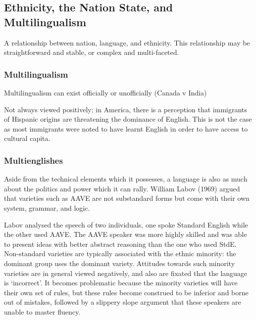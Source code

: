 \documentclass[../main.tex]{subfiles}
\begin{document}
    \subsection{Ethnicity, the Nation State, and Multilingualism}
    A relationship between nation, language, and ethnicity. This relationship may be straightforward and stable, or complex and multi-faceted.
    
    \subsubsection{Multilingualism}
    Multilingualism can exist officially or unofficially (Canada v India)\par
    Not always viewed positively; in America, there is a perception that immigrants of Hispanic origins are threatening the dominance of English. This is not the case as most immigrants were noted to have learnt English in order to have access to cultural capita. \par
    
    \subsubsection{Multienglishes}
    Aside from the technical elements which it possesses, a language is also as much about the politics and power which it can rally. William Labov (1969) argued that varieties such as AAVE are not substandard forms but come with their own system, grammar, and logic. \par
    Labov analysed the speech of two individuals, one spoke Standard English while the other used AAVE. The AAVE speaker was more highly skilled and was able to present ideas with better abstract reasoning than the one who used StdE. Non-standard varieties are typically associated with the ethnic minority: the dominant group uses the dominant variety. Attitudes towards such minority varieties are in general viewed negatively, and also are fixated that the language is `incorrect'. It becomes problematic because the minority varieties will have their own set of rules, but these rules become construed to be inferior and borne out of mistakes, followed by a slippery slope argument that these speakers are unable to master fluency.
\end{document}
